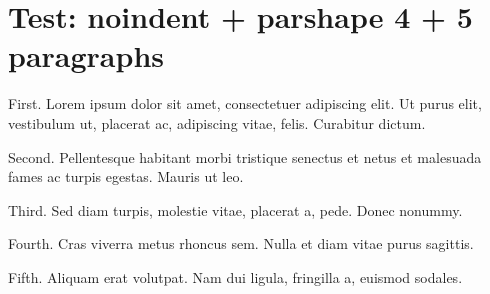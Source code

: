 \documentclass[11pt,a4paper]{article}
\begin{document}
\section{Test: noindent + parshape 4 + 5 paragraphs}

\noindent
{}
%
First. Lorem ipsum dolor sit amet, consectetuer adipiscing elit. Ut purus elit, vestibulum ut, placerat ac, adipiscing vitae, felis. Curabitur dictum.

Second. Pellentesque habitant morbi tristique senectus et netus et malesuada fames ac turpis egestas. Mauris ut leo.

Third. Sed diam turpis, molestie vitae, placerat a, pede. Donec nonummy.

Fourth. Cras viverra metus rhoncus sem. Nulla et diam vitae purus sagittis.

Fifth. Aliquam erat volutpat. Nam dui ligula, fringilla a, euismod sodales.

\everypar{}%
\end{document}

